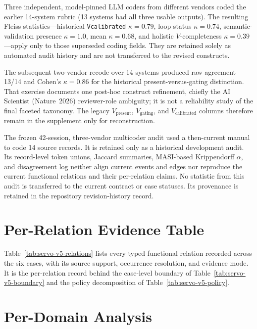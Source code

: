 \documentclass{article}
\begin{document}
Three independent, model-pinned LLM coders from different vendors coded the earlier 14-system rubric (13 systems had all three usable outputs). The resulting Fleiss statistics---historical \texttt{Vcalibrated} $\kappa{=}0.79$, loop status $\kappa{=}0.74$, semantic-validation presence $\kappa{=}1.0$, mean $\kappa{=}0.68$, and holistic $V$-completeness $\kappa{=}0.39$---apply only to those superseded coding fields. They are retained solely as automated audit history and are not transferred to the revised constructs.

The subsequent two-vendor recode over 14 systems produced raw agreement 13/14 and Cohen's $\kappa{=}0.86$ for the historical present-versus-gating distinction. That exercise documents one post-hoc construct refinement, chiefly the AI Scientist (Nature~2026) reviewer-role ambiguity; it is not a reliability study of the final faceted taxonomy. The legacy $V_\text{present}$, $V_\text{gating}$, and $V_\text{calibrated}$ columns therefore remain in the supplement only for reconstruction.

The frozen 42-session, three-vendor multicoder audit used a then-current manual to code 14 source records. It is retained only as a historical development audit. Its record-level token unions, Jaccard summaries, MASI-based Krippendorff $\alpha$, and disagreement log neither align current events and edges nor reproduce the current functional relations and their per-relation claims. No statistic from this audit is transferred to the current contract or case statuses. Its provenance is retained in the repository revision-history record.

\section{Per-Relation Evidence Table}
\label{app:relations}

Table~\ref{tab:servo-v5-relations} lists every typed functional relation recorded across the
six cases, with its source support, occurrence resolution, and evidence mode. It is the
per-relation record behind the case-level boundary of Table~\ref{tab:servo-v5-boundary} and
the policy decomposition of Table~\ref{tab:servo-v5-policy}.



\section{Per-Domain Analysis}
\label{app:domains}
\end{document}
